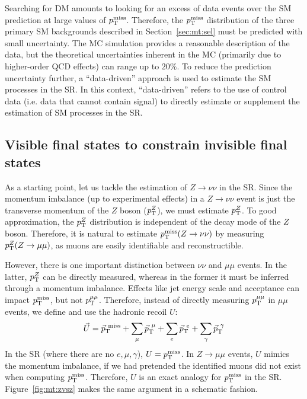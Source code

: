 Searching for DM amounts to looking for an excess of data events over the SM prediction at large values of $p_\mathrm{T}^\mathrm{miss}$.
Therefore, the $p_\mathrm{T}^\mathrm{miss}$ distribution of the three primary SM backgrounds described in Section~\ref{sec:mt:sel} must be predicted with small uncertainty.
The MC simulation provides a reasonable description of the data, but the theoretical uncertainties inherent in the MC (primarily due to higher-order QCD effects) can range up to $20\%$.
To reduce the prediction uncertainty further, a ``data-driven'' approach is used to estimate the SM processes in the SR.
In this context, ``data-driven'' refers to the use of control data (i.e. data that cannot contain signal) to directly estimate or supplement the estimation of SM processes in the SR.

\subsection{Visible final states to constrain invisible final states}

As a starting point, let us tackle the estimation of $Z\rightarrow\nu\nu$ in the SR.
Since the momentum imbalance (up to experimental effects) in a $Z\rightarrow\nu\nu$ event is just the transverse momentum of the $Z$ boson ($p_\mathrm{T}^Z$), we must estimate $p_\mathrm{T}^Z$.
To good approximation, the $p_\mathrm{T}^Z$ distribution is independent of the decay mode of the $Z$ boson.
Therefore, it is natural to estimate $p_\mathrm{T}^\mathrm{miss}(Z\rightarrow\nu\nu)$ by measuring $p_\mathrm{T}^Z(Z\rightarrow\mu\mu)$, as muons are easily identifiable and reconstructible.

However, there is one important distinction between $\nu\nu$ and $\mu\mu$ events.
In the latter, $p_\mathrm{T}^Z$ can be directly measured, whereas in the former it must be inferred through a momentum imbalance.
Effects like jet energy scale and acceptance can impact $p_\mathrm{T}^\mathrm{miss}$, but not $p_\mathrm{T}^{\mu\mu}$.
Therefore, instead of directly measuring $p_\mathrm{T}^{\mu\mu}$ in $\mu\mu$ events, we define and use the hadronic recoil $U$:
\begin{equation}
    \vec{U} = \vec{p}_\mathrm{T}^\mathrm{~miss} + \sum_{\mu} \vec{p}_\mathrm{T}^{~\mu} + \sum_{e} \vec{p}_\mathrm{T}^{~e} + \sum_\gamma \vec{p}_\mathrm{T}^{~\gamma}
    \label{eq:u}
\end{equation}
In the SR (where there are no $e,\mu,\gamma$), $U = p_\mathrm{T}^\mathrm{miss}$.
In $Z\rightarrow\mu\mu$ events, $U$ mimics the momentum imbalance, if we had pretended the identified muons did not exist when computing $p_\mathrm{T}^\mathrm{miss}$.
Therefore, $U$ is an exact analogy for $p_\mathrm{T}^\mathrm{miss}$ in the SR.
Figure~\ref{fig:mt:zvsz} makes the same argument in a schematic fashion.

